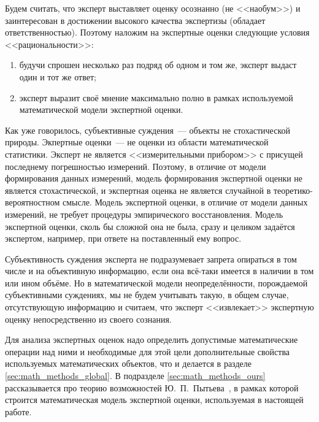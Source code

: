 Будем считать, что эксперт выставляет оценку осознанно (не <<наобум>>) и заинтересован в достижении высокого качества экспертизы (обладает ответственностью). %
Поэтому наложим на экспертные оценки следующие условия <<рациональности>>:
\begin{enumerate}
 \item будучи спрошен несколько раз подряд об одном и том же, эксперт выдаст один и тот же ответ; 
 \item эксперт выразит своё мнение максимально полно в рамках используемой математической модели экспертной оценки.
\end{enumerate}

Как уже говорилось, субъективные суждения~--- объекты не стохастической природы. Экпертные оценки~--- не оценки из области математической статистики. Эксперт не является <<измерительными прибором>> с присущей последнему погрешностью измерений. Поэтому, в отличие от модели формирования данных измерений, модель формирования экспертной оценки не является стохастической, и экспертная оценка не является случайной в теоретико-вероятностном смысле. Модель экспертной оценки, в отличие от модели данных измерений, не требует процедуры эмпирического восстановления. Модель экспертной оценки, сколь бы сложной она не была, сразу и целиком задаётся экспертом, например, при ответе на поставленный ему вопрос.
 
Субъективность суждения эксперта не подразумевает запрета опираться в том числе и на объективную информацию, если она всё-таки имеется в наличии в том или ином объёме. Но в математической модели неопределённости, порождаемой субъективными суждениях, мы не будем учитывать такую, в общем случае, отсутствующую информацию и считаем, что эксперт <<извлекает>> экспертную оценку непосредственно из своего сознания. 

Для анализа экспертных оценок надо определить допустимые математические операции над ними и необходимые для этой цели дополнительные свойства используемых математических объектов, что и делается в разделе \ref{sec:math_methods_global}. В подразделе \ref{sec:math_methods_ours} рассказывается про теорию возможностей Ю.~П.~Пытьева~\cite{possbook}, в рамках которой строится математическая модель экспертной оценки, используемая в настоящей работе.  



